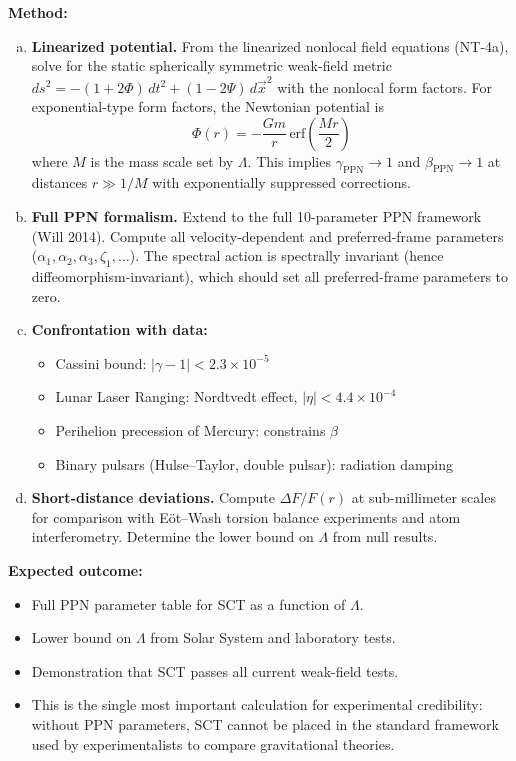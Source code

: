 \documentclass[12pt,a4paper]{article}
\newcommand{\method}[1]{\noindent\textbf{Method:} #1\par}
\newcommand{\outcome}[1]{\noindent\textbf{Expected outcome:} #1\par}
\begin{document}
\method{
\begin{enumerate}[(a)]
  \item \textbf{Linearized potential.} From the linearized nonlocal field equations (NT-4a),
    solve for the static spherically symmetric weak-field metric
    $ds^2 = -(1 + 2\Phi)\,dt^2 + (1 - 2\Psi)\,d\vec{x}^2$ with the nonlocal
    form factors. For exponential-type form factors, the Newtonian potential is
    \begin{equation}
      \Phi(r) = -\frac{Gm}{r}\,\text{erf}\!\left(\frac{Mr}{2}\right)
    \end{equation}
    where $M$ is the mass scale set by $\Lambda$. This implies
    $\gamma_{\text{PPN}} \to 1$ and $\beta_{\text{PPN}} \to 1$ at distances
    $r \gg 1/M$ with exponentially suppressed corrections.
  \item \textbf{Full PPN formalism.} Extend to the full 10-parameter PPN framework
    (Will 2014). Compute all velocity-dependent and preferred-frame parameters
    ($\alpha_1, \alpha_2, \alpha_3, \zeta_1, \ldots$). The spectral action is
    spectrally invariant (hence diffeomorphism-invariant), which should set all
    preferred-frame parameters to zero.
  \item \textbf{Confrontation with data:}
    \begin{itemize}
      \item Cassini bound: $|\gamma - 1| < 2.3 \times 10^{-5}$
      \item Lunar Laser Ranging: Nordtvedt effect, $|\eta| < 4.4 \times 10^{-4}$
      \item Perihelion precession of Mercury: constrains $\beta$
      \item Binary pulsars (Hulse--Taylor, double pulsar): radiation damping
    \end{itemize}
  \item \textbf{Short-distance deviations.} Compute $\Delta F/F(r)$ at
    sub-millimeter scales for comparison with E\"ot--Wash torsion balance
    experiments and atom interferometry. Determine the lower bound on $\Lambda$
    from null results.
\end{enumerate}
}

\outcome{
\begin{itemize}
  \item Full PPN parameter table for SCT as a function of $\Lambda$.
  \item Lower bound on $\Lambda$ from Solar System and laboratory tests.
  \item Demonstration that SCT passes all current weak-field tests.
  \item This is the single most important calculation for experimental
    credibility: without PPN parameters, SCT cannot be placed in the
    standard framework used by experimentalists to compare gravitational
    theories.
\end{itemize}
}
\end{document}
